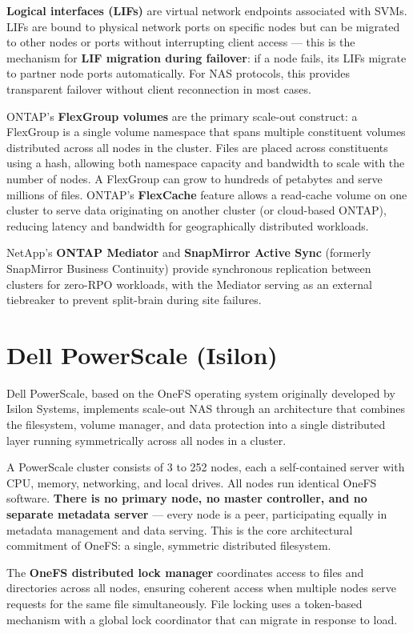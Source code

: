\textbf{Logical interfaces (LIFs)} are virtual network endpoints associated with SVMs. LIFs are bound to physical network ports on specific nodes but can be migrated to other nodes or ports without interrupting client access --- this is the mechanism for \textbf{LIF migration during failover}: if a node fails, its LIFs migrate to partner node ports automatically. For NAS protocols, this provides transparent failover without client reconnection in most cases.

ONTAP's \textbf{FlexGroup volumes} are the primary scale-out construct: a FlexGroup is a single volume namespace that spans multiple constituent volumes distributed across all nodes in the cluster. Files are placed across constituents using a hash, allowing both namespace capacity and bandwidth to scale with the number of nodes. A FlexGroup can grow to hundreds of petabytes and serve millions of files. ONTAP's \textbf{FlexCache} feature allows a read-cache volume on one cluster to serve data originating on another cluster (or cloud-based ONTAP), reducing latency and bandwidth for geographically distributed workloads.

NetApp's \textbf{ONTAP Mediator} and \textbf{SnapMirror Active Sync} (formerly SnapMirror Business Continuity) provide synchronous replication between clusters for zero-RPO workloads, with the Mediator serving as an external tiebreaker to prevent split-brain during site failures.

\section{Dell PowerScale (Isilon)}
Dell PowerScale, based on the OneFS operating system originally developed by Isilon Systems, implements scale-out NAS through an architecture that combines the filesystem, volume manager, and data protection into a single distributed layer running symmetrically across all nodes in a cluster.

A PowerScale cluster consists of 3 to 252 nodes, each a self-contained server with CPU, memory, networking, and local drives. All nodes run identical OneFS software. \textbf{There is no primary node, no master controller, and no separate metadata server} --- every node is a peer, participating equally in metadata management and data serving. This is the core architectural commitment of OneFS: a single, symmetric distributed filesystem.

The \textbf{OneFS distributed lock manager} coordinates access to files and directories across all nodes, ensuring coherent access when multiple nodes serve requests for the same file simultaneously. File locking uses a token-based mechanism with a global lock coordinator that can migrate in response to load.

